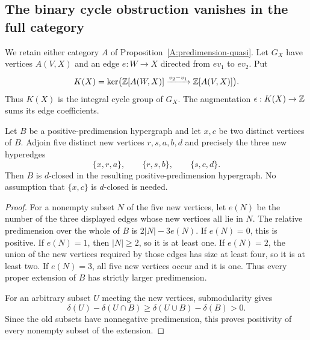 \subsection{The binary cycle obstruction vanishes in the full category}

We retain either category $A$ of
Proposition~\ref{A:predimension-quasi}. Let $G_X$ have vertices
$A(V,X)$ and an edge $e:W\to X$ directed from $ev_1$ to $ev_2$.
Put
\[
 K(X)=\ker\bigl(\mathbb Z[A(W,X)]\xrightarrow{v_2-v_1}
                         \mathbb Z[A(V,X)]\bigr).
\]
Thus $K(X)$ is the integral cycle group of $G_X$. The augmentation
$\epsilon:K(X)\to\mathbb Z$ sums its edge coefficients.

\begin{lemma}
\label{A:predimension-three-path}
Let $B$ be a positive-predimension hypergraph and let $x,c$ be two
distinct vertices of $B$. Adjoin five distinct new vertices
$r,s,a,b,d$ and precisely the three new hyperedges
\[
 \{x,r,a\},\qquad \{r,s,b\},\qquad \{s,c,d\}.
 \tag{LP}\label{eq:predimension-loose-path}
\]
Then $B$ is $d$-closed in the resulting positive-predimension
hypergraph. No assumption that $\{x,c\}$ is $d$-closed is needed.
\end{lemma}
\begin{proof}
For a nonempty subset $N$ of the five new vertices, let $e(N)$ be
the number of the three displayed edges whose new vertices all lie
in $N$. The relative predimension over the whole of $B$ is
$2|N|-3e(N)$. If $e(N)=0$, this is positive. If $e(N)=1$, then
$|N|\geq2$, so it is at least one. If $e(N)=2$, the union of the
new vertices required by those edges has size at least four, so it
is at least two. If $e(N)=3$, all five new vertices occur and it is
one. Thus every proper extension of $B$ has strictly larger
predimension.

For an arbitrary subset $U$ meeting the new vertices,
submodularity gives
\[
 \delta(U)-\delta(U\cap B)
 \geq\delta(U\cup B)-\delta(B)>0.
\]
Since the old subsets have nonnegative predimension, this proves
positivity of every nonempty subset of the extension.
\end{proof}

